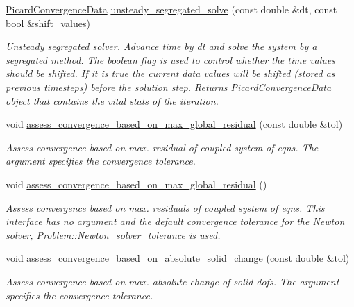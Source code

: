 \begin{DoxyCompactItemize}
\hyperlink{classoomph_1_1PicardConvergenceData}{Picard\+Convergence\+Data} \hyperlink{classoomph_1_1SegregatableFSIProblem_a17f019ebaf83e170219bf605a8554111}{unsteady\+\_\+segregated\+\_\+solve} (const double \&dt, const bool \&shift\+\_\+values)
\begin{DoxyCompactList}\small\item\em Unsteady segregated solver. Advance time by dt and solve the system by a segregated method. The boolean flag is used to control whether the time values should be shifted. If it is true the current data values will be shifted (stored as previous timesteps) before the solution step. Returns \hyperlink{classoomph_1_1PicardConvergenceData}{Picard\+Convergence\+Data} object that contains the vital stats of the iteration. \end{DoxyCompactList}\item 
void \hyperlink{classoomph_1_1SegregatableFSIProblem_a88eb2704f55c89db093cc2857490b727}{assess\+\_\+convergence\+\_\+based\+\_\+on\+\_\+max\+\_\+global\+\_\+residual} (const double \&tol)
\begin{DoxyCompactList}\small\item\em Assess convergence based on max. residual of coupled system of eqns. The argument specifies the convergence tolerance. \end{DoxyCompactList}\item 
void \hyperlink{classoomph_1_1SegregatableFSIProblem_a2fba426552e48abb7ff8a554c20953da}{assess\+\_\+convergence\+\_\+based\+\_\+on\+\_\+max\+\_\+global\+\_\+residual} ()
\begin{DoxyCompactList}\small\item\em Assess convergence based on max. residuals of coupled system of eqns. This interface has no argument and the default convergence tolerance for the Newton solver, \hyperlink{classoomph_1_1Problem_a94536b381e949edf5bb4d44434e08925}{Problem\+::\+Newton\+\_\+solver\+\_\+tolerance} is used. \end{DoxyCompactList}\item 
void \hyperlink{classoomph_1_1SegregatableFSIProblem_aa0b531963389cf3b2ad253891931def9}{assess\+\_\+convergence\+\_\+based\+\_\+on\+\_\+absolute\+\_\+solid\+\_\+change} (const double \&tol)
\begin{DoxyCompactList}\small\item\em Assess convergence based on max. absolute change of solid dofs. The argument specifies the convergence tolerance. \end{DoxyCompactList}\item 

\end{DoxyCompactItemize}
